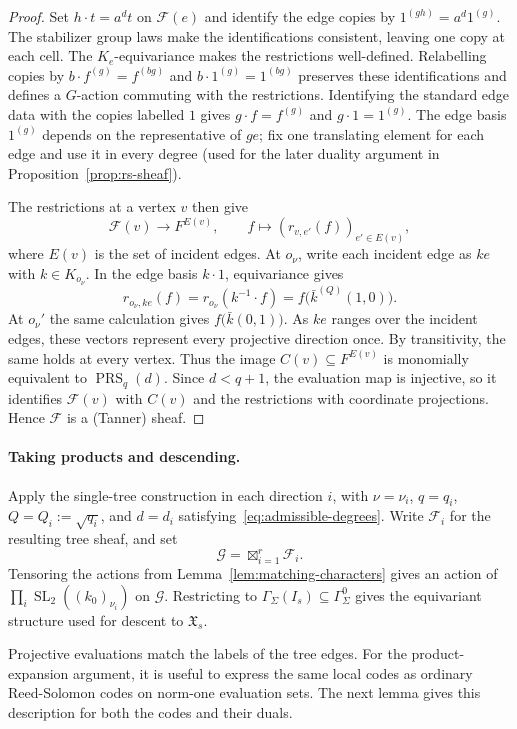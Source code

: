 \documentclass[11pt,letterpaper]{article}
\theoremstyle{definition}
\theoremstyle{remark}
\newcommand{\cF}{\mathcal F}
\newcommand{\X}{\mathfrak{X}}
\newcommand{\SL}{\operatorname{SL}}
\begin{document}
\begin{proof}
Set $h\cdot t=a^dt$ on $\cF(e)$ and identify the edge copies by
$1^{(gh)}=a^d1^{(g)}$. The stabilizer group laws make the identifications
consistent, leaving one copy at each cell. The $K_e$-equivariance makes the
restrictions well-defined. Relabelling copies by
$b\cdot f^{(g)}=f^{(bg)}$ and $b\cdot1^{(g)}=1^{(bg)}$ preserves these
identifications and defines a $G$-action commuting with the restrictions.
Identifying the standard edge data with the copies labelled $1$ gives
$g\cdot f=f^{(g)}$ and $g\cdot1=1^{(g)}$.
The edge basis $1^{(g)}$ depends on the representative of $ge$;
fix one translating element for each edge and use it in every degree (used for the later duality argument in Proposition~\ref{prop:rs-sheaf}).

The restrictions at a vertex $v$ then give
\[
 \cF(v)\longrightarrow F^{E(v)},\qquad
 f\longmapsto(r_{v,e'}(f))_{e'\in E(v)},
\]
where $E(v)$ is the set of incident edges. At $o_\nu$, write each
incident edge as $ke$ with $k\in K_{o_\nu}$. In the edge basis $k\cdot1$,
equivariance gives
\[
 r_{o_\nu,ke}(f)=r_{o_\nu}(k^{-1}\cdot f)
                 =f\bigl(\bar k^{(Q)}(1,0)\bigr).
\]
At $o_\nu'$ the same calculation gives $f\bigl(\bar k(0,1)\bigr)$.
As $ke$ ranges over the incident edges, these vectors represent every
projective direction once.
By transitivity, the same holds at every vertex.
Thus the image $C(v)\subseteq F^{E(v)}$ is monomially equivalent
to $\operatorname{PRS}_q(d)$.
Since $d<q+1$, the evaluation map is injective,
so it identifies $\cF(v)$ with $C(v)$ and the restrictions with coordinate
projections. Hence $\cF$ is a (Tanner) sheaf.
\end{proof}

\paragraph{Taking products and descending.}
Apply the single-tree construction in each direction $i$, with
$\nu=\nu_i$, $q=q_i$, $Q=Q_i:=\sqrt{q_i}$, and $d=d_i$
satisfying~\eqref{eq:admissible-degrees}.
Write $\cF_i$ for the resulting tree sheaf, and set
\[
 \mathcal G=\boxtimes_{i=1}^r\cF_i.
\]
Tensoring the actions from Lemma~\ref{lem:matching-characters} gives an
action of $\prod_i\SL_2((k_0)_{\nu_i})$ on $\mathcal G$. Restricting to
$\Gamma_\Sigma(I_s)\subseteq\Gamma_\Sigma^0$
gives the equivariant structure used for descent to $\X_s$.

Projective evaluations match the labels of the tree edges.
For the product-expansion argument, it is useful to express
the same local codes as ordinary Reed-Solomon codes on
norm-one evaluation sets.
The next lemma gives this description for both the codes
and their duals.
\end{document}
